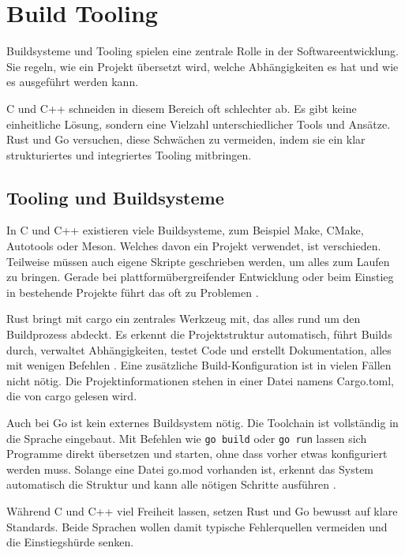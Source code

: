 \section{Build Tooling}
\label{sec:Build_Tooling}

Buildsysteme und Tooling spielen eine zentrale Rolle in der Softwareentwicklung. Sie regeln, 
wie ein Projekt übersetzt wird, welche Abhängigkeiten es hat und wie es ausgeführt werden kann. 

C und C++ schneiden in diesem Bereich oft schlechter ab. Es gibt keine einheitliche Lösung, 
sondern eine Vielzahl unterschiedlicher Tools und Ansätze. Rust und Go versuchen, 
diese Schwächen zu vermeiden, indem sie ein klar strukturiertes und integriertes Tooling mitbringen.

\subsection{Tooling und Buildsysteme}
\label{subsec:Tooling_und_Buildsysteme}

In C und C++ existieren viele Buildsysteme, zum Beispiel Make, CMake, Autotools oder Meson. 
Welches davon ein Projekt verwendet, ist verschieden. Teilweise müssen auch eigene 
Skripte geschrieben werden, um alles zum Laufen zu bringen. Gerade bei plattformübergreifender 
Entwicklung oder beim Einstieg in bestehende Projekte führt das oft zu Problemen \autocite{SurprisinglyComplexWorld}.

Rust bringt mit cargo ein zentrales Werkzeug mit, das alles rund um den Buildprozess abdeckt. 
Es erkennt die Projektstruktur automatisch, führt Builds durch, verwaltet Abhängigkeiten, 
testet Code und erstellt Dokumentation, alles mit wenigen Befehlen \autocite{HelloCargoRust}. 
Eine zusätzliche Build-Konfiguration ist in vielen Fällen nicht nötig. 
Die Projektinformationen stehen in einer Datei namens Cargo.toml, die von cargo gelesen wird.

Auch bei Go ist kein externes Buildsystem nötig. Die Toolchain ist vollständig in die Sprache 
eingebaut. Mit Befehlen wie \texttt{go build} oder \texttt{go run} lassen sich Programme direkt 
übersetzen und starten, ohne dass vorher etwas konfiguriert werden muss. 
Solange eine Datei go.mod vorhanden ist, erkennt das System automatisch die Struktur 
und kann alle nötigen Schritte ausführen \autocite{UsingGoModules}.

Während C und C++ viel Freiheit lassen, setzen Rust und Go bewusst auf klare Standards. 
Beide Sprachen wollen damit typische Fehlerquellen vermeiden und die Einstiegshürde senken.

